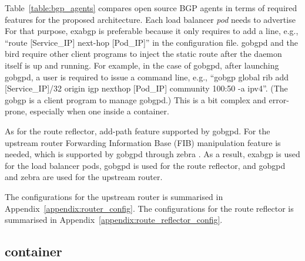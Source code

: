 Table~\ref{table:bgp_agents} compares open source BGP agents in terms of required features for the proposed architecture.
Each load balancer {\em pod} needs to advertise 
For that purpose, exabgp is preferable because it only requires to add a line, e.g., \enquote{route [Service\_IP] next-hop [Pod\_IP]} in the configuration file.
 gobgpd and the bird require other client programs to inject the static route after the daemon itself is up and running.
For example, in the case of gobgpd, after launching gobgpd, a user is required to issue a command line, e.g., \enquote{gobgp global rib add [Service\_IP]/32 origin igp nexthop [Pod\_IP] community 100:50 -a ipv4}.
 (The gobgp is a client program to manage gobgpd.)
This is a bit complex and error-prone, especially when one  inside a container.

As for the route reflector, add-path \cite{rfc7911} feature   supported by gobgpd.
For the upstream router Forwarding Information Base (FIB) manipulation \cite{exa-networks_2018} feature is needed, which is supported by gobgpd through zebra \cite{jakma2014introduction,osrg_gobgp_zebra}.
As a result, exabgp is used for the load balancer pods, gobgpd is used for the route reflector, and gobgpd and zebra are used for the upstream router.

The configurations for the upstream router is summarised in Appendix~\ref{appendix:router_config}.
The configurations for the route reflector is summarised in Appendix~\ref{appendix:route_reflector_config}.

\subsection{ container}\label{sec:ipvs}

